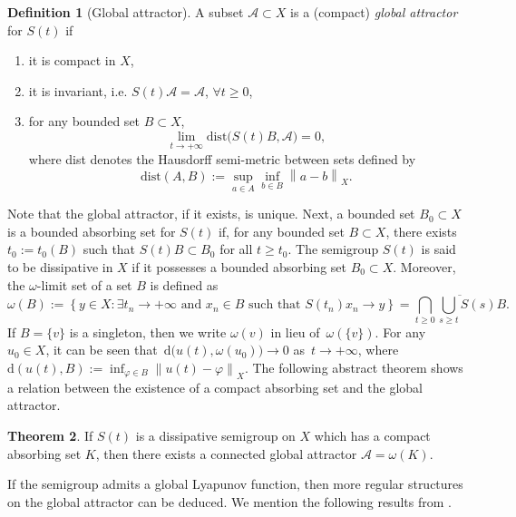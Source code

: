 \documentclass[11pt, reqno]{amsart}
\theoremstyle{definition}
\newtheorem{theorem}{Theorem}[section]
\newtheorem{definition}[theorem]{Definition}
\numberwithin{equation}{section}
\newcommand{\norm}[2]{\left\|{#1}\right\|_{#2}}
\begin{document}
\begin{definition}[Global attractor]\label{def:glob att}
A subset $\mathcal{A}\subset X$ is a (compact) \emph{global attractor} for $S(t)$ if
\begin{enumerate}
	\item it is compact in $X$,
	\item it is invariant, i.e. $S(t) \mathcal{A}= \mathcal{A}$, $\forall t\geq 0$,
	\item for any bounded set $B\subset X$,
	\[
		\lim_{t\to +\infty} \text{dist}\big(S(t)B, \mathcal{A}\big)=0,
	\]
	where dist denotes the Hausdorff semi-metric between sets defined by
	\[
		\text{dist}(A,B):= \sup_{a\in A} \inf_{b\in B} \norm{a-b}{X}.
	\]
\end{enumerate}
\end{definition}
Note that the global attractor, if it exists, is unique. Next, a bounded set $B_0\subset X$ is a bounded absorbing set for $S(t)$ if, for any bounded set $B\subset X$, there exists $t_0:= t_0(B)$ such that $S(t)B \subset B_0$ for all $t\geq t_0$. The semigroup $S(t)$ is said to be dissipative in $X$ if it possesses a bounded absorbing set $B_0\subset X$. Moreover, the $\omega$-limit set of a set $B$ is defined as
\begin{equation*}
	\omega(B):= 
	\left\{ y\in X: \exists t_n \to +\infty \text{ and } x_n\in B \text{ such that } S(t_n)x_n \to y \right\}
	=
	\overline{\bigcap_{t\geq 0} \bigcup_{s\geq t} S(s)B}.
\end{equation*}
If $B=\{v\}$ is a singleton, then we write $\omega(v)$ in lieu of~$\omega(\{v\})$.
For any $u_0\in X$, it can be seen that~$\text{d}\big(u(t), \omega(u_0)\big) \to 0$ as~$t\to +\infty$, where~$\text{d}(u(t),B):= \inf_{\varphi\in B} \norm{u(t)-\varphi}{X}$.
The following abstract theorem shows a relation between the existence of a compact absorbing set and the global attractor.

\begin{theorem}\label{the:global attr}
If $S(t)$ is a dissipative semigroup on $X$ which has a compact absorbing set $K$, then there exists a connected global attractor $\mathcal{A}=\omega(K)$.
\end{theorem}

If the semigroup admits a global Lyapunov function, then more regular structures on the global attractor can be deduced. We mention the following results from \cite{MirZel08}.
\end{document}
